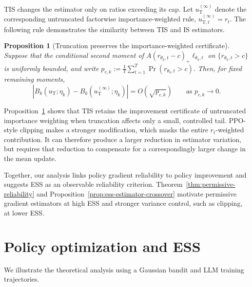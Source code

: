 \documentclass[11pt]{article}
\newtheorem{proposition}[theorem]{Proposition}
\theoremstyle{remark}
\begin{document}
TIS changes the estimator only on ratios exceeding its cap. Let $u_{\mathrm T}^{(\infty)}$ denote the corresponding untruncated factorwise importance-weighted rule, $u_{\mathrm T,t}^{(\infty)}=r_t$. The following rule demonstrates the similarity between TIS and IS estimators. 
\begin{proposition}[Truncation preserves the importance-weighted certificate]
\label{prop:tis-close}
Suppose that the conditional second moment of
$A(r_{\theta_k,t}-c)_+\ell_{\theta_k,t}$ on
$\{r_{\theta_k,t}>c\}$ is uniformly bounded, and write $ p_{c,k}
 :=
 \frac1T\sum_{t=1}^T
 \Pr(r_{\theta_k,t}>c).$ Then, for fixed remaining
moments,
\begin{equation}
 \left|
 B_k(u_{\mathrm T};\eta_k)
 -
 B_k(u_{\mathrm T}^{(\infty)};\eta_k)
 \right|
 =
 O(\sqrt{p_{c,k}})
 \qquad\text{as }p_{c,k}\rightarrow0 .
 \label{eq:tis-close-certificate}
\end{equation}
\end{proposition}

Proposition~\ref{prop:tis-close} shows that TIS retains the improvement certificate of untruncated importance weighting when truncation affects only a small, controlled tail. PPO-style clipping makes a stronger modification, which masks the entire $r_t$-weighted contribution. It can therefore produce a larger reduction in estimator variation, but requires that reduction to compensate for a correspondingly larger change in the mean update.

Together, our analysis links policy gradient reliability to policy improvement and suggests ESS as an observable reliability criterion. Theorem~\ref{thm:permissive-reliability} and Proposition~\ref{prop:ess-estimator-crossover} motivate permissive gradient estimators at high ESS and stronger variance control, such as clipping, at lower ESS.



\section{Policy optimization and ESS}
We illustrate the theoretical analysis using a Gaussian bandit and LLM training trajectories.
\end{document}
